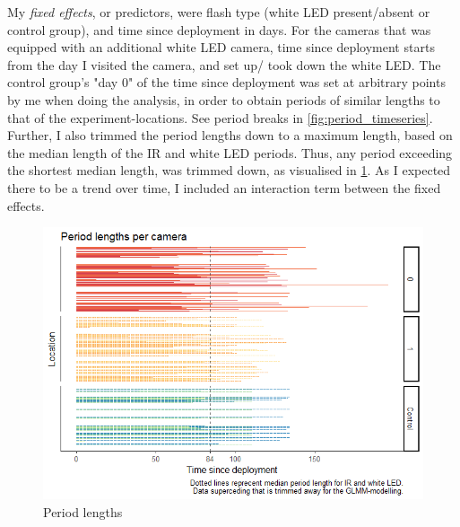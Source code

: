 My \emph{fixed effects}, or predictors, were flash type (white LED present/absent or control group), and time since deployment in days.
For the cameras that was equipped with an additional white LED camera, time since deployment starts from the day I visited the camera, and set up/ took down the white LED.
The control group's "day 0" of the time since deployment was set at arbitrary points by me when doing the analysis, in order to obtain periods of similar lengths to that of the experiment-locations. See period breaks in \ref{fig:period_timeseries}.
Further, I also trimmed the period lengths down to a maximum length, based on the median length of the IR and white LED periods. Thus, any period exceeding the shortest median length, was trimmed down, as visualised in \ref{fig:median_period}. 
As I expected there to be a trend over time, I included an interaction term between the fixed effects.


\begin{figure}
\caption{\label{fig:median_period} Period lengths}
	\centering
	\includegraphics[scale=.8]{../R/glmm_sp_files/figure-gfm/period-length-wControl-1.png}
\end{figure}


